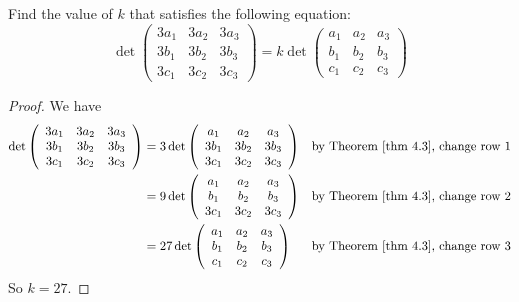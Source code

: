 \begin{exercise} \label{exercise 4.2.2}
Find the value of \(k\) that satisfies the following equation:
\[
    \det\left(\begin{array}{ccc}
        3 a_{1} & 3 a_{2} & 3 a_{3} \\
        3 b_{1} & 3 b_{2} & 3 b_{3} \\
        3 c_{1} & 3 c_{2} & 3 c_{3}
    \end{array}\right) = 
    k \det\left(\begin{array}{ccc}
        a_{1} & a_{2} & a_{3} \\
        b_{1} & b_{2} & b_{3} \\
        c_{1} & c_{2} & c_{3}
    \end{array}\right)
\]
\end{exercise}

\begin{proof}
We have
\begin{align*}
    \det\left(\begin{array}{ccc}
        3 a_{1} & 3 a_{2} & 3 a_{3} \\
        3 b_{1} & 3 b_{2} & 3 b_{3} \\
        3 c_{1} & 3 c_{2} & 3 c_{3}
    \end{array}\right)
    & = 3 \det\left(\begin{array}{ccc}
            a_{1} & a_{2} & a_{3} \\
            3 b_{1} & 3 b_{2} & 3 b_{3} \\
            3 c_{1} & 3 c_{2} & 3 c_{3}
        \end{array}\right) & \text{by \THM{4.3}, change row \(1\)} \\
    & = 9 \det\left(\begin{array}{ccc}
            a_{1} & a_{2} & a_{3} \\
            b_{1} & b_{2} & b_{3} \\
            3 c_{1} & 3 c_{2} & 3 c_{3}
        \end{array}\right) & \text{by \THM{4.3}, change row \(2\)} \\
    & = 27 \det\left(\begin{array}{ccc}
            a_{1} & a_{2} & a_{3} \\
            b_{1} & b_{2} & b_{3} \\
            c_{1} & c_{2} & c_{3}
        \end{array}\right) & \text{by \THM{4.3}, change row \(3\)}
\end{align*}
So \(k = 27\).
\end{proof}

